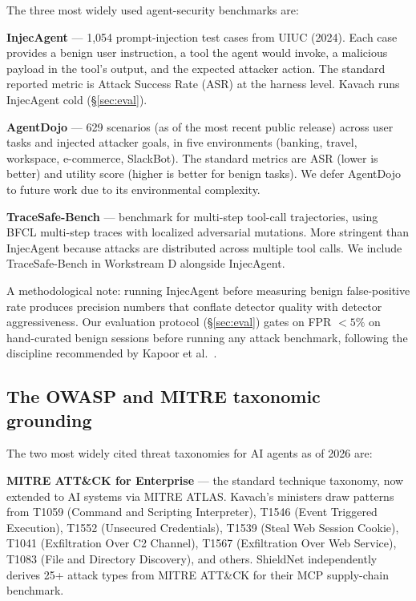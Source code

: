 The three most widely used agent-security benchmarks are:

\textbf{InjecAgent} \cite{zhan2024injecagent} — 1,054 prompt-injection test cases
from UIUC (2024). Each case provides a benign user instruction, a tool the agent
would invoke, a malicious payload in the tool's output, and the expected attacker
action. The standard reported metric is Attack Success Rate (ASR) at the harness
level. Kavach runs InjecAgent cold (\S\ref{sec:eval}).

\textbf{AgentDojo} \cite{debenedetti2024agentdojo} — 629 scenarios (as of the
most recent public release) across user tasks and injected attacker goals, in five
environments (banking, travel, workspace, e-commerce, SlackBot). The standard
metrics are ASR (lower is better) and utility score (higher is better for benign
tasks). We defer AgentDojo to future work due to its environmental complexity.

\textbf{TraceSafe-Bench} \cite{tracesafe2026} — benchmark for multi-step tool-call
trajectories, using BFCL multi-step traces with localized adversarial mutations.
More stringent than InjecAgent because attacks are distributed across multiple
tool calls. We include TraceSafe-Bench in Workstream D alongside InjecAgent.

A methodological note: running InjecAgent before measuring benign false-positive
rate produces precision numbers that conflate detector quality with detector
aggressiveness. Our evaluation protocol (\S\ref{sec:eval}) gates on FPR ${<}5\%$
on hand-curated benign sessions before running any attack benchmark, following
the discipline recommended by Kapoor et al.~\cite{kapoor2024aiagents}.

\subsection{The OWASP and MITRE taxonomic grounding}

The two most widely cited threat taxonomies for AI agents as of 2026 are:

\textbf{MITRE ATT\&CK for Enterprise} — the standard technique taxonomy, now
extended to AI systems via MITRE ATLAS. Kavach's ministers draw patterns from
T1059 (Command and Scripting Interpreter), T1546 (Event Triggered Execution),
T1552 (Unsecured Credentials), T1539 (Steal Web Session Cookie), T1041
(Exfiltration Over C2 Channel), T1567 (Exfiltration Over Web Service), T1083
(File and Directory Discovery), and others. ShieldNet \cite{shieldnet2026}
independently derives 25+ attack types from MITRE ATT\&CK for their MCP
supply-chain benchmark.

